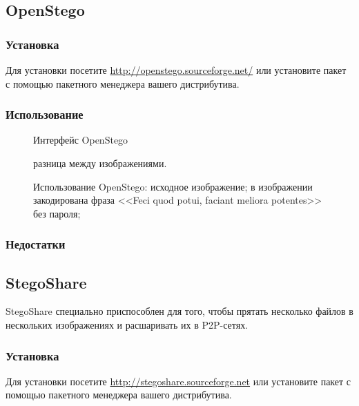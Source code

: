\subsection{OpenStego}
\subsubsection{Установка}
Для установки посетите \url{http://openstego.sourceforge.net/} или установите пакет с помощью пакетного менеджера вашего дистрибутива.
\subsubsection{Использование}
\begin{figure}[h]
\caption{Интерфейс OpenStego}
\end{figure}
\begin{figure}[ht!]
\vspace{-4ex}
\centering
{}
\hspace{4ex}
\hspace{4ex}
\caption{Использование OpenStego:
 исходное изображение;
 в изображении закодирована фраза <<Feci quod potui, faciant meliora potentes>> без пароля;
} разница между изображениями.
\end{figure}
\subsubsection{Недостатки}
\subsection{StegoShare}
StegoShare специально приспособлен для того, чтобы прятать несколько файлов в нескольких изображениях и расшаривать их в P2P-сетях.
\subsubsection{Установка}
Для установки посетите \url{http://stegoshare.sourceforge.net} или установите пакет с помощью пакетного менеджера вашего дистрибутива.
